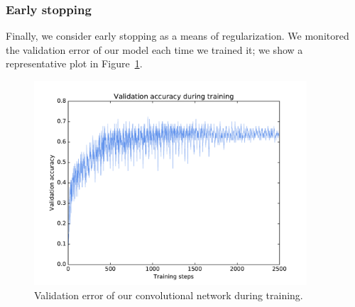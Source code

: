 \documentclass{article}
\begin{document}
\begin{multicols}{2}




\subsubsection{Early stopping}

Finally, we consider early stopping as a means of regularization.
We monitored the validation error
of our model each time we trained it;
we show a representative plot in Figure~\ref{fig:2-4-4-validation-acc}.

\begin{figure}[t]
   \centering
   \includegraphics[width=4in]{img/2-4-4-validation-acc-new.pdf}
   \caption{Validation error of our convolutional network during training.}
   \label{fig:2-4-4-validation-acc}
\end{figure}


\end{multicols}
\end{document}
